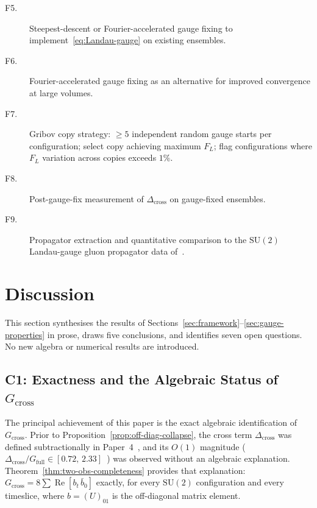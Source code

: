 \documentclass[12pt]{article}
\numberwithin{equation}{section}
\theoremstyle{plain}
\theoremstyle{definition}
\theoremstyle{remark}
\newcommand{\su}{\mathrm{SU}}              %
\newcommand{\Gcross}{G_{\mathrm{cross}}}   %
\newcommand{\Gfull}{G_{\mathrm{full}}}     %
\newcommand{\Dcross}{\Delta_{\mathrm{cross}}}  %
\begin{document}
	\begin{description}
		\item[F5.] Steepest-descent or Fourier-accelerated gauge fixing
		to implement~\eqref{eq:Landau-gauge} on existing ensembles.
		
		\item[F6.] Fourier-accelerated gauge fixing as an alternative for
		improved convergence at large volumes.
		
		\item[F7.] Gribov copy strategy: $\geq 5$ independent random
		gauge starts per configuration; select copy achieving maximum
		$F_{L}$; flag configurations where $F_{L}$ variation across
		copies exceeds $1\%$.
		
		\item[F8.] Post-gauge-fix measurement of $\Dcross$ on
		gauge-fixed ensembles.
		
		\item[F9.] Propagator extraction and quantitative comparison to
		the $\su(2)$ Landau-gauge gluon propagator data
		of~\cite{CucchieriMendes2008,Bogolubsky}.
	\end{description}
	
	\section{Discussion}
	\label{sec:discussion}
	
	This section synthesises the results of
	Sections~\ref{sec:framework}--\ref{sec:gauge-properties} in prose,
	draws five conclusions, and identifies seven open questions.  No new
	algebra or numerical results are introduced.
	
	\subsection{C1: Exactness and the Algebraic Status of
		\texorpdfstring{$\Gcross$}{Gcross}}
	\label{sec:disc-exactness}
	
	The principal achievement of this paper is the exact algebraic
	identification of $\Gcross$.  Prior to
	Proposition~\ref{prop:off-diag-collapse}, the cross term $\Dcross$
	was defined subtractionally in Paper~4~\cite{FirestoneP4}, and its
	$O(1)$ magnitude ($\Dcross/\Gfull\in[0.72,\,2.33]$~\cite{FirestoneP4})
	was observed without an algebraic explanation.
	Theorem~\ref{thm:two-obs-completeness} provides that explanation:
	$\Gcross = 8\sum\operatorname{Re}[b_t\,\bar{b}_0]$ exactly, for every
	$\su(2)$ configuration and every timeslice, where $b = (U)_{01}$ is
	the off-diagonal matrix element.
	
\end{document}
